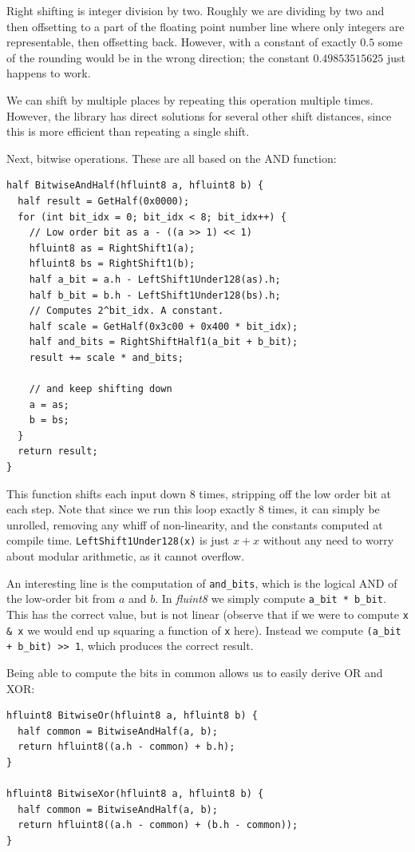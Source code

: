 \documentclass[twocolumn]{article}
\begin{document}
Right shifting is integer division by two. Roughly we are dividing by
two and then offsetting to a part of the floating point number line
where only integers are representable, then offsetting back. However,
with a constant of exactly $0.5$ some of the rounding would be in the
wrong direction; the constant $0.49853515625$ just happens to work.

We can shift by multiple places by repeating this operation multiple
times.
However, the library has direct solutions for several other shift
distances, since this is more efficient than repeating a single shift.

Next, bitwise operations. These are all based on the AND function:

\begin{lstlisting}
half BitwiseAndHalf(hfluint8 a, hfluint8 b) {
  half result = GetHalf(0x0000);
  for (int bit_idx = 0; bit_idx < 8; bit_idx++) {
    // Low order bit as a - ((a >> 1) << 1)
    hfluint8 as = RightShift1(a);
    hfluint8 bs = RightShift1(b);
    half a_bit = a.h - LeftShift1Under128(as).h;
    half b_bit = b.h - LeftShift1Under128(bs).h;
    // Computes 2^bit_idx. A constant.
    half scale = GetHalf(0x3c00 + 0x400 * bit_idx);
    half and_bits = RightShiftHalf1(a_bit + b_bit);
    result += scale * and_bits;

    // and keep shifting down
    a = as;
    b = bs;
  }
  return result;
}
\end{lstlisting}

This function shifts each input down 8 times, stripping off
the low order bit at each step. Note that since we run this
loop exactly 8 times, it can simply be unrolled, removing
any whiff of non-linearity, and the constants computed at
compile time. \verb+LeftShift1Under128(x)+ is just $x + x$
without any need to worry about modular arithmetic, as it
cannot overflow.

An interesting line is the computation of \verb+and_bits+,
which is the logical AND of the low-order bit from $a$ and $b$.
In {\it fluint8} we simply compute \verb+a_bit * b_bit+. This
has the correct value, but is not linear (observe that if
we were to compute \verb+x & x+ we would end up squaring a
function of {\tt x} here). Instead we compute \verb|(a_bit + b_bit) >> 1|,
which produces the correct result.

Being able to compute the bits in common allows us to easily derive
OR and XOR:

\begin{lstlisting}
hfluint8 BitwiseOr(hfluint8 a, hfluint8 b) {
  half common = BitwiseAndHalf(a, b);
  return hfluint8((a.h - common) + b.h);
}

hfluint8 BitwiseXor(hfluint8 a, hfluint8 b) {
  half common = BitwiseAndHalf(a, b);
  return hfluint8((a.h - common) + (b.h - common));
}
\end{lstlisting}
\end{document}
